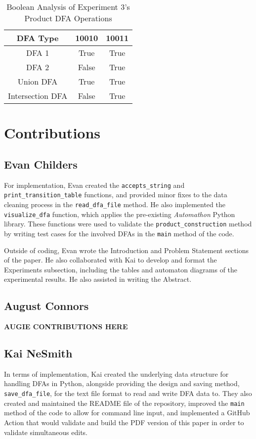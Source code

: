 \documentclass[conference]{IEEEtran}
\begin{document}
\begin{table}[h!]
\centering
\caption{Boolean Analysis of Experiment 3's Product DFA Operations}
\label{table-exp3-dfabool}
\begin{tabular}{|c|c|c|}
\hline
\textbf{DFA Type} & \textbf{10010} & \textbf{10011} \\ \hline
DFA 1 & True & True \\ \hline
DFA 2 & False & True \\ \hline
Union DFA & True & True \\ \hline
Intersection DFA & False & True \\ \hline
\end{tabular}
\end{table} 

\section{Contributions}
\subsection{Evan Childers}
For implementation, Evan created the \texttt{accepts\_string} and \texttt{print\_transition\_table} functions, and provided minor fixes to the data cleaning process in the \texttt{read\_dfa\_file} method. He also implemented the \texttt{visualize\_dfa} function, which applies the pre-existing \textit{Automathon} Python library. These functions were used to validate the \texttt{product\_construction} method by writing test cases for the involved DFAs in the \texttt{main} method of the code.

Outside of coding, Evan wrote the Introduction and Problem Statement sections of the paper. He also collaborated with Kai to develop and format the Experiments subsection, including the tables and automaton diagrams of the experimental results. He also assisted in writing the Abstract.
\subsection{August Connors}
\textbf{AUGIE CONTRIBUTIONS HERE}
\subsection{Kai NeSmith}
In terms of implementation, Kai created the underlying data structure for handling DFAs in Python, alongside providing the design and saving method, \texttt{save\_dfa\_file}, for the text file format to read and write DFA data to. They also created and maintained the README file of the repository, improved the \texttt{main} method of the code to allow for command line input, and implemented a GitHub Action that would validate and build the PDF version of this paper in order to validate simultaneous edits.
\end{document}
